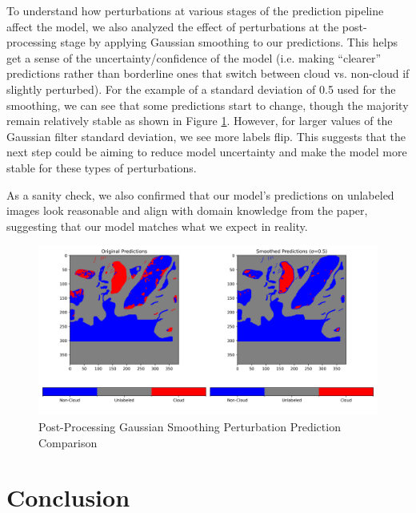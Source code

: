 \documentclass[10pt,letterpaper]{article}
\begin{document}
To understand how perturbations at various stages of the prediction pipeline affect the model, we also analyzed the effect of perturbations at the post-processing stage by applying Gaussian smoothing to our predictions. This helps get a sense of the uncertainty/confidence of the model (i.e. making “clearer” predictions rather than borderline ones that switch between cloud vs. non-cloud if slightly perturbed). For the example of a standard deviation of 0.5 used for the smoothing, we can see that some predictions start to change, though the majority remain relatively stable as shown in Figure \ref{fig:post_processing_perturbation}. However, for larger values of the Gaussian filter standard deviation, we see more labels flip. This suggests that the next step could be aiming to reduce model uncertainty and make the model more stable for these types of perturbations.

As a sanity check, we also confirmed that our model's predictions on unlabeled images look reasonable and align with domain knowledge from the paper, suggesting that our model matches what we expect in reality.

\begin{figure}[ht]
    \centering
    \includegraphics[width=0.75\linewidth]{figs/post_processing_perturbation.png}
    \caption{Post-Processing Gaussian Smoothing Perturbation Prediction Comparison}
    \label{fig:post_processing_perturbation}
\end{figure}

\section{Conclusion}
\end{document}
